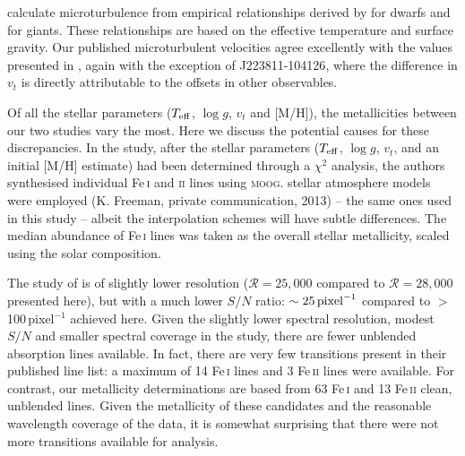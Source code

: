 \documentclass{emulateapj}
\begin{document}
\citet{wylie-de-boer;et-al_2012} calculate microturbulence from empirical relationships derived by \citet{reddy;et-al_2003} for dwarfs and \citet{fulbright_2000} for giants. These relationships are based on the effective temperature and surface gravity. Our published microturbulent velocities agree excellently with the values presented in \citet{wylie-de-boer;et-al_2012}, again with the exception of {J223811-104126}, where the difference in $v_{t}$ is directly attributable to the offsets in other observables.

Of all the stellar parameters ($T_{\rm eff}$, $\log{g}$, $v_{t}$ and [M/H]), the metallicities between our two studies vary the most. Here we discuss the potential causes for these discrepancies. In the \citet{wylie-de-boer;et-al_2012} study, after the stellar parameters ($T_{\rm eff}$, $\log{g}$, $v_{t}$, and an initial [M/H] estimate) had been determined through a $\chi^2$ analysis, the authors synthesised individual {Fe\,\textsc{i}} and \textsc{ii} lines using \textsc{moog}. \citet{castelli;kurucz_2003} stellar atmosphere models were employed (K. Freeman, private communication, 2013) -- the same ones used in this study -- albeit the interpolation schemes will have subtle differences. The median abundance of {Fe\,\textsc{i}} lines was taken as the overall stellar metallicity, scaled using the \citet{grevesse;sauval_1998} solar composition.

The study of \citet{wylie-de-boer;et-al_2012} is of slightly lower resolution ($\mathcal{R} = 25,000$ compared to $\mathcal{R} = 28,000$ presented here), but with a much lower $S/N$ ratio: ${\sim{}25\,{\rm pixel}^{-1}}$ compared to {$>$100\,pixel$^{-1}$} achieved here. Given the slightly lower spectral resolution,  modest $S/N$ and smaller spectral coverage in the \citet{wylie-de-boer;et-al_2012} study, there are fewer unblended absorption lines available. In fact, there are very few transitions present in their published line list: a maximum of 14 {Fe\,\textsc{i}} lines and 3 {Fe\,\textsc{ii}} lines were available. For contrast, our metallicity determinations are based from 63 {Fe\,\textsc{i}} and 13 {Fe\,\textsc{ii}} clean, unblended lines. Given the metallicity of these candidates and the reasonable wavelength coverage of the \citet{wylie-de-boer;et-al_2012} data, it is somewhat surprising that there were not more transitions available for analysis. 
\end{document}
